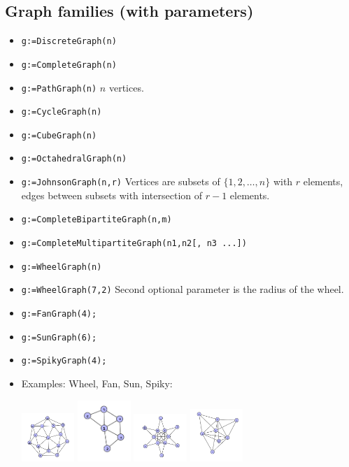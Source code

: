 \documentclass[11pt]{article}
\begin{document}
\begin{multicols}{3}
\section{Graph families (with parameters)}
\label{sec-2}

\begin{itemize}
\item \verb~g:=DiscreteGraph(n)~
\item \verb~g:=CompleteGraph(n)~
\item \verb~g:=PathGraph(n)~ \(n\) vertices.
\item \verb~g:=CycleGraph(n)~
\item \verb~g:=CubeGraph(n)~
\item \verb~g:=OctahedralGraph(n)~
\item \verb~g:=JohnsonGraph(n,r)~ Vertices are subsets of \(\{1,2,\ldots,n\}\)
with \(r\) elements, edges between subsets with intersection of
\(r-1\) elements.
\item \verb~g:=CompleteBipartiteGraph(n,m)~
\item \verb~g:=CompleteMultipartiteGraph(n1,n2[, n3 ...])~
\item \verb~g:=WheelGraph(n)~
\item \verb~g:=WheelGraph(7,2)~ Second optional parameter is the radius of the
wheel.
\item \verb~g:=FanGraph(4);~
\item \verb~g:=SunGraph(6);~
\item \verb~g:=SpikyGraph(4);~
\item Examples: Wheel, Fan, Sun, Spiky:

\includegraphics[width=2cm]{wheel.png} \includegraphics[width=2cm]{fan.png} \includegraphics[width=2cm]{sun.png} \includegraphics[width=2cm]{spiky.png}
\end{itemize}


\end{multicols}
\end{document}
